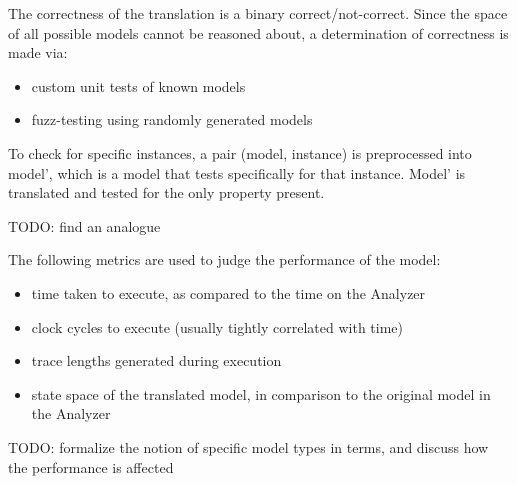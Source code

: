 



The correctness of the translation is a binary correct/not-correct. Since the space of all possible models cannot be reasoned about, a determination of correctness is made via:

\begin{itemize}
\item custom unit tests of known models
\item fuzz-testing using randomly generated models
\end{itemize}

To check for specific instances, a pair (model, instance) is preprocessed into model', which is a model that tests specifically for that instance. Model' is translated and tested for the only property present.

TODO: find an analogue

The following metrics are used to judge the performance of the model:

\begin{itemize}
	\item time taken to execute, as compared to the time on the Analyzer
	\item clock cycles to execute (usually tightly correlated with time)
	\item trace lengths generated during execution
	\item state space of the translated model, in comparison to the original model in the Analyzer
\end{itemize}


TODO: formalize the notion of specific model types in terms, and discuss how the performance is affected